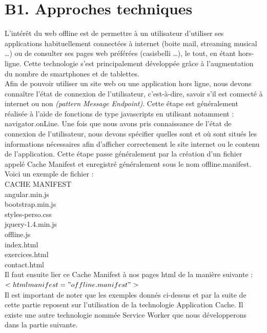 \section{B1. Approches techniques}

	L'intérêt du web offline est de permettre à un utilisateur d’utiliser ses applications habituellement connectées à internet (boite mail, streaming musical …) ou de consulter ses pages web préférées (casisbelli …), le tout, en étant hors-ligne. Cette technologie s’est principalement développée grâce à l’augmentation du nombre de smartphones et de tablettes. \\

	Afin de pouvoir utiliser un site web ou une application hors ligne, nous devons connaître l’état de connexion de l’utilisateur, c’est-à-dire, savoir s’il est connecté à internet ou non \textit{(pattern Message Endpoint)}. Cette étape est généralement réalisée à l’aide de fonctions de type javascripts en utilisant notamment : navigator.onLine. Une fois que nous avons pris connaissance de l’état de connexion de l’utilisateur, nous devons spécifier quelles sont et où sont situés les informations nécessaires afin d’afficher correctement le site internet ou le contenu de l’application. Cette étape passe généralement par la création d’un fichier appelé Cache Manifest et enregistré généralement sous le nom offline.manifest. Voici un exemple de fichier :\\

	CACHE MANIFEST\\
	angular.min.js\\
	bootstrap.min.js\\
	styles-perso.css\\
	jquery-1.4.min.js\\
	offline.js\\
	index.html\\
	exercices.html\\
	contact.html\\

	Il faut ensuite lier ce Cache Manifest à nos pages html de la manière suivante : \textit{$<html manifest="offline.manifest">$}\\

	Il est important de noter que les exemples donnés ci-dessus et par la suite de cette partie reposent sur l’utilisation de la technologie Application Cache. Il existe une autre technologie nommée Service Worker que nous développerons dans la partie suivante.\\

